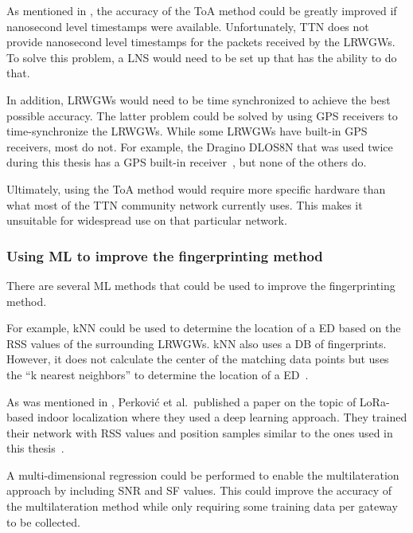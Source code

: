 As mentioned in , the accuracy of the \ac{ToA} method could be greatly improved if nanosecond level timestamps were available.
Unfortunately, \ac{TTN} does not provide nanosecond level timestamps for the packets received by the \aclp{LRWGW}.
To solve this problem, a \ac{LNS} would need to be set up that has the ability to do that.

In addition, \aclp{LRWGW} would need to be time synchronized to achieve the best possible accuracy.
The latter problem could be solved by using \ac{GPS} receivers to time-synchronize the \aclp{LRWGW}.
While some \aclp{LRWGW} have built-in \ac{GPS} receivers, most do not.
For example, the Dragino DLOS8N that was used twice during this thesis has a \ac{GPS} built-in receiver~\cite{dragino_technology_co_ltd_dlos8n_2023}, but none of the others do.

Ultimately, using the \ac{ToA} method would require more specific hardware than what most of the \ac{TTN} community network currently uses.
This makes it unsuitable for widespread use on that particular network.

\subsubsection{Using \acl{ML} to improve the fingerprinting method}

There are several \ac{ML} methods that could be used to improve the fingerprinting method.

For example, \ac{kNN} could be used to determine the location of a \acl{ED} based on the \ac{RSS} values of the surrounding \aclp{LRWGW}.
\ac{kNN} also uses a \ac{DB} of fingerprints.
However, it does not calculate the center of the matching data points but uses the ``k nearest neighbors'' to determine the location of a \acl{ED}~\cite{anagnostopoulos_reproducible_2019}.

As was mentioned in , Perković et al.\ published a paper on the topic of \ac{LoRa}-based indoor localization where they used a deep learning approach.
They trained their network with \ac{RSS} values and position samples similar to the ones used in this thesis~\cite{perkovic_machine_2023}.

A multi-dimensional regression could be performed to enable the multilateration approach by including \ac{SNR} and \ac{SF} values.
This could improve the accuracy of the multilateration method while only requiring some training data per gateway to be collected.

